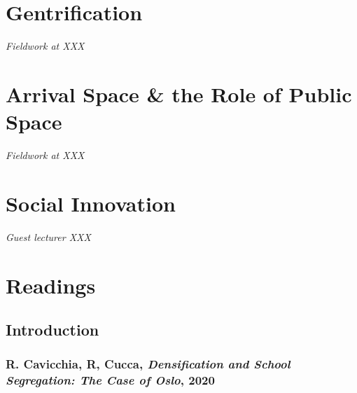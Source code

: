 \documentclass{article}
\begin{document}
\section{Gentrification}

\textit{Fieldwork at XXX}

\section{Arrival Space \& the Role of Public Space}

\textit{Fieldwork at XXX}


\section{Social Innovation}

\textit{Guest lecturer XXX}


\section{Readings}

\subsection{Introduction}

\subsubsection{R. Cavicchia, R, Cucca, \textit{Densification and School Segregation: The Case of Oslo}, 2020}
\end{document}
